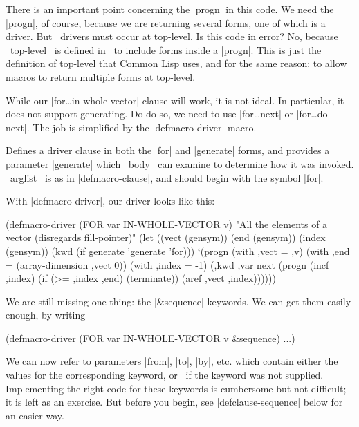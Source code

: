There is an important point concerning the |progn| in this code.  We
need the |progn|, of course, because we are returning several forms,
one of which is a driver.  But \iter\ drivers must occur at top-level.
Is this code in error?  No, because ~top-level~ is defined in \iter\
to include forms inside a |progn|.  This is just the definition of
top-level that Common Lisp uses, and for the same reason: to allow
macros to return multiple forms at top-level.

While our |for\dots in-whole-vector| clause will work, it is not
ideal.  In particular, it does not support generating.  Do do so, we
need to use |for\dots next| or |for\dots do-next|.  The job is
simplified by the |defmacro-driver| macro.

\begin{clauses}

Defines a driver clause in
both the |for| and |generate| forms, and provides a parameter
|generate| which ~body~ can examine to determine how it was invoked.
~arglist~ is as in |defmacro-clause|, and should begin with the symbol
|for|.

\end{clauses}

With |defmacro-driver|, our driver looks like this:
\begin{program}
(defmacro-driver (FOR var IN-WHOLE-VECTOR v)
  "All the elements of a vector (disregards fill-pointer)"
   (let ((vect (gensym))
         (end (gensym))
         (index (gensym))
         (kwd (if generate 'generate 'for)))
     `(progn
        (with ,vect = ,v)
        (with ,end = (array-dimension ,vect 0))
        (with ,index = -1)
        (,kwd ,var next (progn (incf ,index)
                               (if (>= ,index ,end) (terminate))
                               (aref ,vect ,index))))))
\end{program}


We are still missing one thing: the |\&sequence| keywords.
We can get them easily enough, by writing
\begin{program}
(defmacro-driver (FOR var IN-WHOLE-VECTOR v \&sequence)
  ...)
\end{program}
We can now refer to parameters |from|, |to|, |by|, etc. which contain
either the values for the corresponding keyword, or \nil\ if the
keyword was not supplied.  Implementing the right code for these
keywords is cumbersome but not difficult; it is left as an exercise.
But before you begin, see |defclause-sequence| below for an easier way.

